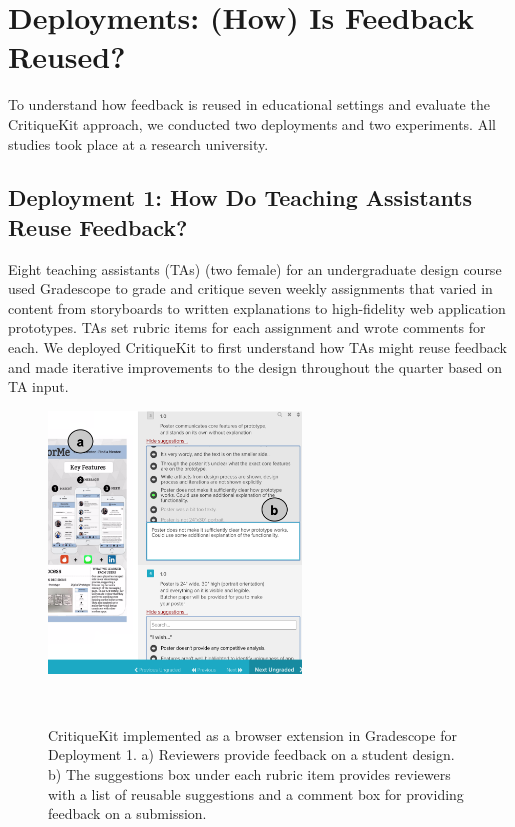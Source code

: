 \section{Deployments: (How) Is Feedback Reused?}
To understand how feedback is reused in educational settings and evaluate the CritiqueKit approach, we conducted two deployments and two experiments. All studies took place at a research university. 

\subsection{Deployment 1: How Do Teaching Assistants Reuse Feedback?}
Eight teaching assistants (TAs) (two female) for an undergraduate design course used Gradescope to grade and critique seven weekly assignments that varied in content from storyboards to written explanations to high-fidelity web application prototypes. TAs set rubric items for each assignment and wrote comments for each. We deployed CritiqueKit to first understand how TAs might reuse feedback and made iterative improvements to the design throughout the quarter based on TA input.

\begin{figure}[b!]
\centering
  \includegraphics[width=0.6\textwidth]{critiquekit/figures/gradescope.png}
  \caption{CritiqueKit implemented as a browser extension in Gradescope for Deployment 1. a) Reviewers provide feedback on a student design. b) The suggestions box under each rubric item provides reviewers with a list of reusable suggestions and a comment box for providing feedback on a submission.}~\label{fig:critiquekit_gradescope}
\end{figure}

